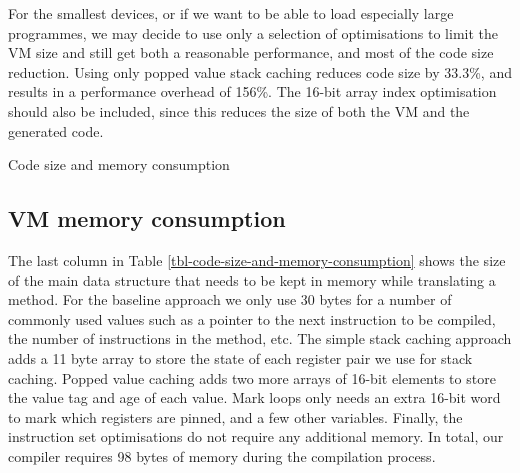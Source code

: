 For the smallest devices, or if we want to be able to load especially large programmes, we may decide to use only a selection of optimisations to limit the VM size and still get both a reasonable performance, and most of the code size reduction. Using only popped value stack caching reduces code size by 33.3\%, and results in a performance overhead of 156\%. The  16-bit array index optimisation should also be included, since this reduces the size of both the VM and the generated code.

\begin{table}[]
\centering
\caption{Code size and memory consumption}
\label{tbl-code-size-and-memory-consumption}
\small

\end{table}

\subsection{VM memory consumption} The last column in Table \ref{tbl-code-size-and-memory-consumption} shows the size of the main data structure that needs to be kept in memory while translating a method. For the baseline approach we only use 30 bytes for a number of commonly used values such as a pointer to the next instruction to be compiled, the number of instructions in the method, etc. The simple stack caching approach adds a 11 byte array to store the state of each register pair we use for stack caching. Popped value caching adds two more arrays of 16-bit elements to store the value tag and age of each value. Mark loops only needs an extra 16-bit word to mark which registers are pinned, and a few other variables. Finally, the instruction set optimisations do not require any additional memory. In total, our compiler requires 98 bytes of memory during the compilation process.


